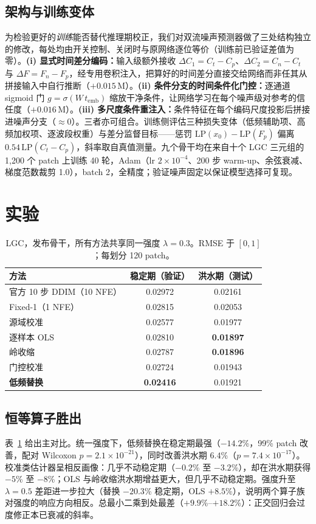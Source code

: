 \documentclass{article}
\begin{document}
\subsection{架构与训练变体}
\label{sec:arch}
为检验更好的\emph{训练}能否替代推理期校正，我们对双流噪声预测器做了三处结构独立的修改，每处均由开关控制、关闭时与原网络逐位等价（训练前已验证差值为零）。\textbf{(i) 显式时间差分编码：}输入级额外接收 $\Delta C_1=C_t-C_p$、$\Delta C_2=C_n-C_t$ 与 $\Delta F=F_n-F_p$，经专用卷积注入，把算好的时间差分直接交给网络而非任其从拼接输入中自行推断（$+0.015$\,M）。\textbf{(ii) 条件分支的时间条件化门控：}逐通道 sigmoid 门 $g=\sigma(W\,t_{\mathrm{emb}})$ 缩放干净条件，让网络学习在每个噪声级对参考的信任度（$+0.016$\,M）。\textbf{(iii) 多尺度条件重注入：}条件特征在每个编码尺度投影后拼接进噪声分支（$\approx0$）。三者亦可组合。训练侧评估三种损失变体（低频辅助项、高频加权项、逐波段权重）与差分监督目标——惩罚 $\mathrm{LP}(x_0)-\mathrm{LP}(F_p)$ 偏离 $0.54\,\mathrm{LP}(C_t-C_p)$，斜率取自真值测量。九个骨干均在来自十个 LGC 三元组的 1{,}200 个 patch 上训练 40 轮，Adam（lr $2\times10^{-4}$、200 步 warm-up、余弦衰减、梯度范数裁剪 1.0），batch 2，全精度；验证噪声固定以保证模型选择可复现。

\section{实验}
\label{sec:exp}

\begin{table}[t]
\centering
\caption{LGC，发布骨干，所有方法共享同一强度 $\lambda{=}0.3$。RMSE 于 $[0,1]$；每划分 120 patch。}
\label{tab:main}
\begin{tabular}{lcc}
\toprule
方法 & 稳定期（验证） & 洪水期（测试） \\
\midrule
官方 10 步 DDIM（10 NFE） & 0.02972 & 0.02161 \\
Fixed-1（1 NFE） & 0.02815 & 0.02053 \\
源域校准 & 0.02577 & 0.01977 \\
逐样本 OLS & 0.02810 & \textbf{0.01897} \\
岭收缩 & 0.02787 & \textbf{0.01896} \\
门控校准 & 0.02724 & 0.01943 \\
\textbf{低频替换} & \textbf{0.02416} & 0.01921 \\
\bottomrule
\end{tabular}
\end{table}

\subsection{恒等算子胜出}
表~\ref{tab:main} 给出主对比。统一强度下，低频替换在稳定期最强（$-14.2$\%，99\% patch 改善，配对 Wilcoxon $p=2.1\times10^{-21}$），同时改善洪水期 $6.4$\%（$p=7.4\times10^{-17}$）。校准类估计器呈相反画像：几乎不动稳定期（$-0.2$\% 至 $-3.2$\%），却在洪水期获得 $-5$\% 至 $-8$\%；OLS 与岭收缩洪水期增益更大，但几乎不动稳定期。强度升至 $\lambda{=}0.5$ 差距进一步拉大（替换 $-20.3$\% 稳定期，OLS $+8.5$\%），说明两个算子族对强度的响应方向相反。总最小二乘到处最差（$+9.9$\%--$+18.2$\%）：正交回归会过度修正本已衰减的斜率。
\end{document}
